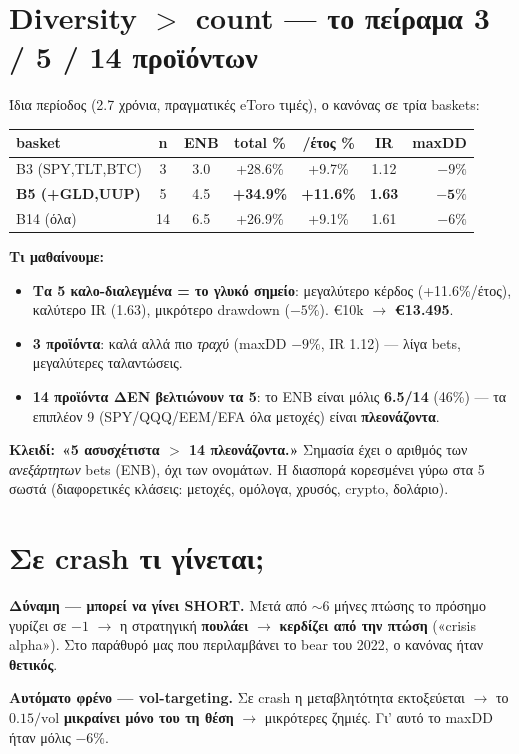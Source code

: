 \documentclass[11pt]{article}
\newcommand{\key}[1]{\par\medskip\noindent\colorbox{soft}{\parbox{\dimexpr\linewidth-2\fboxsep}{\textcolor{accent}{\textbf{Κλειδί:}}\ #1}}\par\medskip}
\begin{document}
\section{Diversity \texorpdfstring{$>$}{>} count --- το πείραμα 3 / 5 / 14 προϊόντων}
Ίδια περίοδος (2.7 χρόνια, πραγματικές eToro τιμές), ο κανόνας σε τρία baskets:
\begin{center}\small
\begin{tabular}{lcccccr}
\toprule
basket & n & ENB & total \% & /έτος \% & IR & maxDD \\
\midrule
B3 (SPY,TLT,BTC) & 3 & 3.0 & +28.6\% & +9.7\% & 1.12 & $-9\%$ \\
\textbf{B5 (+GLD,UUP)} & 5 & 4.5 & \textbf{+34.9\%} & \textbf{+11.6\%} & \textbf{1.63} & $\mathbf{-5\%}$ \\
B14 (όλα) & 14 & 6.5 & +26.9\% & +9.1\% & 1.61 & $-6\%$ \\
\bottomrule
\end{tabular}
\end{center}
\textbf{Τι μαθαίνουμε:}
\begin{itemize}[leftmargin=1.4em]
\item \textbf{Τα 5 καλο-διαλεγμένα = το γλυκό σημείο}: μεγαλύτερο κέρδος (+11.6\%/έτος), καλύτερο IR
(1.63), μικρότερο drawdown ($-5\%$). €10k $\to$ \textbf{€13.495}.
\item \textbf{3 προϊόντα}: καλά αλλά πιο \emph{τραχύ} (maxDD $-9\%$, IR 1.12) --- λίγα bets, μεγαλύτερες
ταλαντώσεις.
\item \textbf{14 προϊόντα ΔΕΝ βελτιώνουν τα 5}: το ENB είναι μόλις \textbf{6.5/14} (46\%) --- τα επιπλέον
9 (SPY/QQQ/EEM/EFA όλα μετοχές) είναι \textbf{πλεονάζοντα}.
\end{itemize}
\key{\textbf{«5 ασυσχέτιστα $>$ 14 πλεονάζοντα.»} Σημασία έχει ο αριθμός των \emph{ανεξάρτητων} bets (ENB),
όχι των ονομάτων. Η διασπορά κορεσμένει γύρω στα 5 σωστά (διαφορετικές κλάσεις: μετοχές, ομόλογα, χρυσός,
crypto, δολάριο).}

\section{Σε crash τι γίνεται;}
\textbf{Δύναμη --- μπορεί να γίνει SHORT.} Μετά από $\sim$6 μήνες πτώσης το πρόσημο γυρίζει σε $-1$ $\to$ η
στρατηγική \textbf{πουλάει} $\to$ \textbf{κερδίζει από την πτώση} («crisis alpha»). Στο παράθυρό μας που
περιλαμβάνει το bear του 2022, ο κανόνας ήταν \textbf{θετικός}.

\textbf{Αυτόματο φρένο --- vol-targeting.} Σε crash η μεταβλητότητα εκτοξεύεται $\to$ το $0.15/\text{vol}$
\textbf{μικραίνει μόνο του τη θέση} $\to$ μικρότερες ζημιές. Γι' αυτό το maxDD ήταν μόλις $-6\%$.
\end{document}
